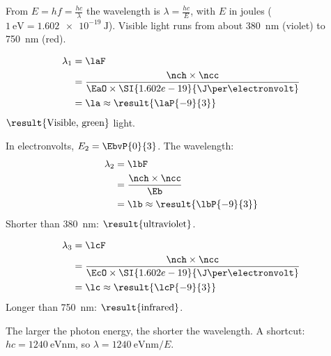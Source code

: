 From $E = h f = \frac{h c}{\lambda}$ the wavelength is $\lambda = \frac{h c}{E}$, with $E$ in joules ($\SI{1}{\electronvolt} = \SI{1.602e-19}{\J}$). Visible light runs from about \SI{380}{\nm} (violet) to \SI{750}{\nm} (red).

\begin{abcliste}
\abc
\begin{align}
 \lambda_1 &= \laF \\
   &= \frac{\nch\times\ncc}{\EaO\times\SI{1.602e-19}{\J\per\electronvolt}} \\
   &= \la \approx \result{\laP{-9}{3}}
\end{align}
$\result{\text{Visible, green}}$ light.

\abc In electronvolts, $E_2 = \EbvP{0}{3}$. The wavelength:
\begin{align}
 \lambda_2 &= \lbF \\
   &= \frac{\nch\times\ncc}{\Eb} \\
   &= \lb \approx \result{\lbP{-9}{3}}
\end{align}
Shorter than \SI{380}{\nm}: $\result{\text{ultraviolet}}$.

\abc
\begin{align}
 \lambda_3 &= \lcF \\
   &= \frac{\nch\times\ncc}{\EcO\times\SI{1.602e-19}{\J\per\electronvolt}} \\
   &= \lc \approx \result{\lcP{-9}{3}}
\end{align}
Longer than \SI{750}{\nm}: $\result{\text{infrared}}$.
\end{abcliste}
The larger the photon energy, the shorter the wavelength. A shortcut: $h c = \SI{1240}{\electronvolt\nm}$, so $\lambda = \SI{1240}{\electronvolt\nm}/E$.

